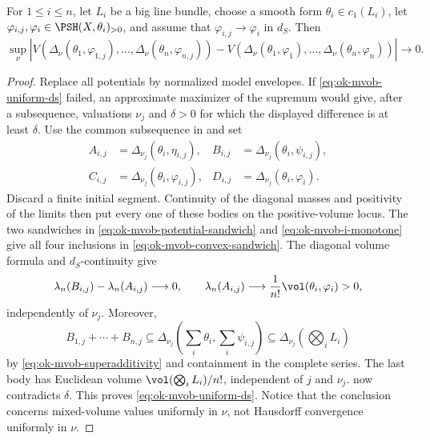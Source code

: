 \begin{proposition}\label{prop:ok-mvob-uniform-ds}
For $1\leq i\leq n$, let $L_i$ be a big line bundle, choose a smooth
form $\theta_i\in c_1(L_i)$, let
$\varphi_{i,j},\varphi_i\in\PSH(X,\theta_i)_{>0}$, and assume that
$\varphi_{i,j}\to\varphi_i$ in $d_S$.
Then
\[
 \sup_\nu\left|
 V(\Delta_\nu(\theta_1,\varphi_{1,j}),\ldots,
   \Delta_\nu(\theta_n,\varphi_{n,j}))
 -V(\Delta_\nu(\theta_1,\varphi_1),\ldots,
   \Delta_\nu(\theta_n,\varphi_n))\right|\longrightarrow0.
\tag{55.39}\label{eq:ok-mvob-uniform-ds}
\]
\end{proposition}

\begin{proof}
Replace all potentials by normalized model envelopes.  If
\eqref{eq:ok-mvob-uniform-ds} failed, an approximate maximizer of the
supremum would give, after a subsequence, valuations $\nu_j$ and
$\delta>0$ for which the displayed difference is at least $\delta$.
Use the common subsequence in  and set
\[
 \begin{aligned}
 A_{i,j}&=\Delta_{\nu_j}(\theta_i,\eta_{i,j}),&
 B_{i,j}&=\Delta_{\nu_j}(\theta_i,\psi_{i,j}),\\
 C_{i,j}&=\Delta_{\nu_j}(\theta_i,\varphi_{i,j}),&
 D_{i,j}&=\Delta_{\nu_j}(\theta_i,\varphi_i).
 \end{aligned}
\]
Discard a finite initial segment.  Continuity of the diagonal masses and
positivity of the limits then put every one of these bodies on the
positive-volume locus.  The two sandwiches in
\eqref{eq:ok-mvob-potential-sandwich} and
\eqref{eq:ok-mvob-i-monotone} give all four inclusions in
\eqref{eq:ok-mvob-convex-sandwich}.  The diagonal volume formula and
$d_S$-continuity give
\[
 \lambda_n(B_{i,j})-\lambda_n(A_{i,j})\longrightarrow0,\qquad
 \lambda_n(A_{i,j})\longrightarrow
 \frac1{n!}\vol(\theta_i,\varphi_i)>0,
\]
independently of $\nu_j$.  Moreover,
\[
 B_{1,j}+\cdots+B_{n,j}
 \subseteq\Delta_{\nu_j}\!\left(\sum_i\theta_i,
                                  \sum_i\psi_{i,j}\right)
 \subseteq\Delta_{\nu_j}\!\left(\bigotimes_iL_i\right)
\]
by \eqref{eq:ok-mvob-superadditivity} and containment in the complete
series.  The last body has Euclidean volume
$\vol(\bigotimes_iL_i)/n!$, independent of $j$ and $\nu_j$.
 now contradicts $\delta$.  This
proves \eqref{eq:ok-mvob-uniform-ds}.  Notice that the conclusion concerns
mixed-volume values uniformly in $\nu$, not Hausdorff convergence
uniformly in $\nu$.
\end{proof}

